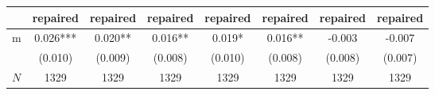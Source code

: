 {
\def\sym#1{\ifmmode^{#1}\else\(^{#1}\)\fi}
\begin{tabular}{l*{7}{c}}
\toprule
          &\multicolumn{1}{c}{repaired}&\multicolumn{1}{c}{repaired}&\multicolumn{1}{c}{repaired}&\multicolumn{1}{c}{repaired}&\multicolumn{1}{c}{repaired}&\multicolumn{1}{c}{repaired}&\multicolumn{1}{c}{repaired}\\
\midrule
m         &    0.026***&    0.020** &    0.016** &    0.019*  &    0.016** &   -0.003   &   -0.007   \\
          &  (0.010)   &  (0.009)   &  (0.008)   &  (0.010)   &  (0.008)   &  (0.008)   &  (0.007)   \\
\midrule
\(N\)     &     1329   &     1329   &     1329   &     1329   &     1329   &     1329   &     1329   \\
\bottomrule
\end{tabular}
}
